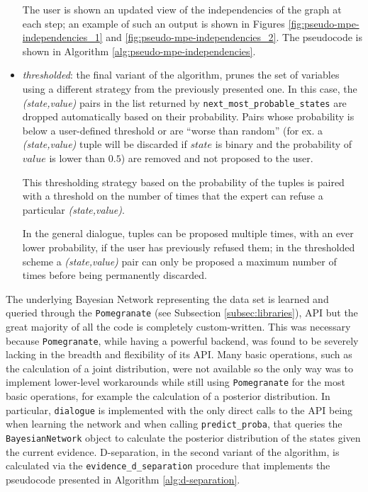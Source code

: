 \begin{itemize}
  	The user is shown an updated view of the independencies of the graph at each step; an example of such an output is shown in Figures \ref{fig:pseudo-mpe-independencies_1} and \ref{fig:pseudo-mpe-independencies_2}.
  	The pseudocode is shown in Algorithm \ref{alg:pseudo-mpe-independencies}.
  \item \textit{thresholded}: the final variant of the algorithm, prunes the set of variables using a different strategy from the previously presented one.
  	In this case, the \textit{(state,value)} pairs in the list returned by \texttt{next\_most\_probable\_states} are dropped automatically based on their probability.
  	Pairs whose probability is below a user-defined threshold or are \enquote{worse than random} (for ex. a \textit{(state,value)} tuple will be discarded if $state$ is binary and the probability of $value$ is lower than $0.5$) are removed and not proposed to the user. 
  	
  	This thresholding strategy based on the probability of the tuples is paired with a threshold on the number of times that the expert can refuse a particular \textit{(state,value)}. 
  	
  	In the general dialogue, tuples can be proposed multiple times, with an ever lower probability, if the user has previously refused them; in the thresholded scheme a \textit{(state,value)} pair can only be proposed a maximum number of times before being permanently discarded.
\end{itemize}

The underlying Bayesian Network representing the data set is learned and queried through the  \texttt{Pomegranate} (see Subsection \ref{subsec:libraries}), API but the great majority of all the code is completely custom-written.
This was necessary because \texttt{Pomegranate}, while having a powerful backend, was found to be severely lacking in the breadth and flexibility of its API.
Many basic operations, such as the calculation of a joint distribution, were not available so the only way was to implement lower-level workarounds while still using \texttt{Pomegranate} for the most basic operations, for example the calculation of a posterior distribution.
In particular, \texttt{dialogue} is implemented with the only direct calls to the API being when learning the network and when calling \texttt{predict\_proba}, that queries the \texttt{BayesianNetwork} object to calculate the posterior distribution of the states given the current evidence.
D-separation, in the second variant of the algorithm, is calculated via the \texttt{evidence\_d\_separation} procedure that implements the pseudocode presented in Algorithm \ref{alg:d-separation}.

